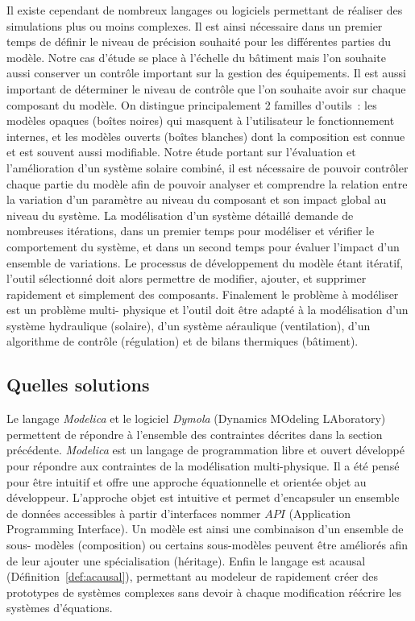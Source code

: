 Il existe cependant de nombreux langages ou logiciels permettant de réaliser des
simulations plus ou moins complexes. Il est ainsi nécessaire dans un premier temps de
définir le niveau de précision souhaité pour les différentes parties du modèle. Notre cas
d’étude se place à l’échelle du bâtiment mais l’on souhaite aussi conserver un contrôle
important sur la gestion des équipements. Il est aussi important de déterminer le niveau
de contrôle que l’on souhaite avoir sur chaque composant du modèle. On distingue
principalement 2 familles d’outils~: les modèles opaques (boîtes noires) qui masquent à
l’utilisateur le fonctionnement internes, et les modèles ouverts (boîtes blanches) dont la
composition est connue et est souvent aussi modifiable. Notre étude portant sur
l’évaluation et l’amélioration d’un système solaire combiné, il est nécessaire de pouvoir
contrôler chaque partie du modèle afin de pouvoir analyser et comprendre la relation entre
la variation d’un paramètre au niveau du composant et son impact global au niveau du système. La
modélisation d’un système détaillé demande de nombreuses itérations, dans un premier temps
pour modéliser et vérifier le  comportement du système, et dans un second temps pour évaluer l’impact d’un ensemble de
variations. Le processus de développement du modèle étant itératif, l’outil sélectionné
doit alors permettre de modifier, ajouter, et supprimer rapidement et simplement des composants.
Finalement le problème à modéliser est un problème multi- physique et l’outil doit être
adapté à la modélisation d’un système hydraulique (solaire), d’un système aéraulique
(ventilation), d’un algorithme de contrôle (régulation) et de bilans thermiques
(bâtiment).



\subsection{Quelles solutions} %
\label{sub:quelles_solutions}
Le langage \emph{Modelica} et le logiciel \emph{Dymola} (Dynamics MOdeling LAboratory)
permettent de répondre à l’ensemble des contraintes décrites dans la section précédente.
\emph{Modelica} est un langage de programmation libre et ouvert développé pour répondre
aux contraintes de la modélisation multi-physique. Il a été pensé pour être intuitif et
offre une approche équationnelle et orientée objet au développeur. L’approche objet est
intuitive et permet d’encapsuler un ensemble de données accessibles à partir d’interfaces
nommer $API$ (Application Programming Interface). Un modèle est ainsi une combinaison d’un ensemble de sous-
modèles (composition) ou certains sous-modèles peuvent être améliorés afin de leur ajouter
une spécialisation (héritage). Enfin le langage est acausal
(Définition~\ref{def:acausal}), permettant au modeleur de rapidement créer des
prototypes de systèmes complexes sans devoir à chaque modification réécrire les systèmes
d’équations.


